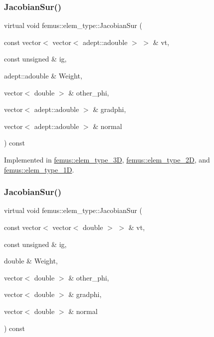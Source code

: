\subsubsection{\texorpdfstring{Jacobian\+Sur()}{JacobianSur()}\hspace{0.1cm}{\footnotesize\ttfamily [1/2]}}
{\footnotesize\ttfamily virtual void femus\+::elem\+\_\+type\+::\+Jacobian\+Sur (\begin{DoxyParamCaption}\item[{const vector$<$ vector$<$ adept\+::adouble $>$ $>$ \&}]{vt,  }\item[{const unsigned \&}]{ig,  }\item[{adept\+::adouble \&}]{Weight,  }\item[{vector$<$ double $>$ \&}]{other\+\_\+phi,  }\item[{vector$<$ adept\+::adouble $>$ \&}]{gradphi,  }\item[{vector$<$ adept\+::adouble $>$ \&}]{normal }\end{DoxyParamCaption}) const\hspace{0.3cm}{\ttfamily [pure virtual]}}



Implemented in \mbox{\hyperlink{classfemus_1_1elem__type__3_d_a8eea4f745f548cc10bb55848c4cd2ba3}{femus\+::elem\+\_\+type\+\_\+3D}}, \mbox{\hyperlink{classfemus_1_1elem__type__2_d_af19f0963ef176d7a3b4180730ef028c9}{femus\+::elem\+\_\+type\+\_\+2D}}, and \mbox{\hyperlink{classfemus_1_1elem__type__1_d_a30e236ab3052558a85af26d862715540}{femus\+::elem\+\_\+type\+\_\+1D}}.

\mbox{\label{classfemus_1_1elem__type_aee56bc66a4d90ae7f7669bf7fa9ed8d7}} 
\subsubsection{\texorpdfstring{Jacobian\+Sur()}{JacobianSur()}\hspace{0.1cm}{\footnotesize\ttfamily [2/2]}}
{\footnotesize\ttfamily virtual void femus\+::elem\+\_\+type\+::\+Jacobian\+Sur (\begin{DoxyParamCaption}\item[{const vector$<$ vector$<$ double $>$ $>$ \&}]{vt,  }\item[{const unsigned \&}]{ig,  }\item[{double \&}]{Weight,  }\item[{vector$<$ double $>$ \&}]{other\+\_\+phi,  }\item[{vector$<$ double $>$ \&}]{gradphi,  }\item[{vector$<$ double $>$ \&}]{normal }\end{DoxyParamCaption}) const\hspace{0.3cm}{\ttfamily [pure virtual]}}



